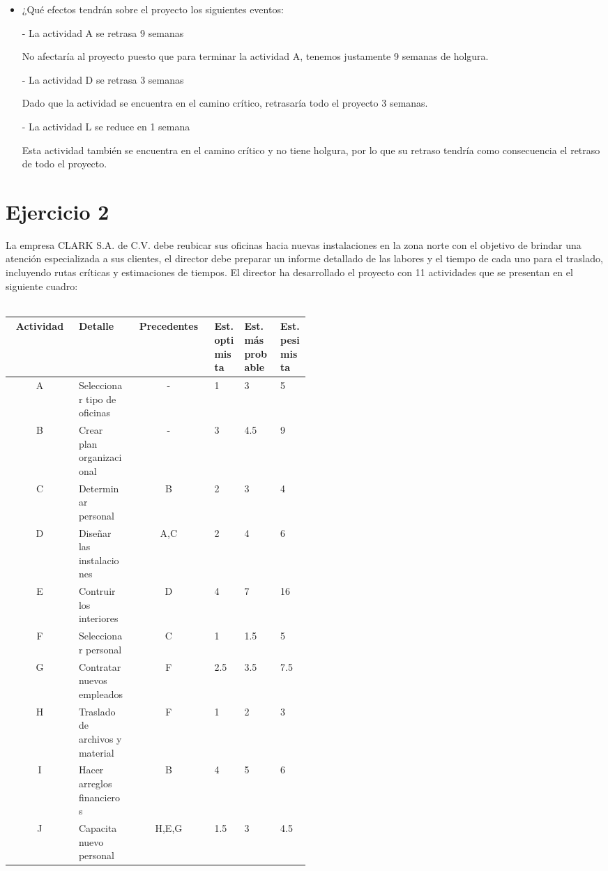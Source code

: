 \documentclass[12pt]{article}
\begin{document}
\begin{itemize}
    \item ¿Qué efectos tendrán sobre el proyecto los siguientes eventos:

    - La actividad A se retrasa 9 semanas

No afectaría al proyecto puesto que para terminar la actividad A, tenemos
justamente 9 semanas de holgura.

    - La actividad D se retrasa 3 semanas

Dado que la actividad se encuentra en el camino crítico, retrasaría todo el
proyecto 3 semanas.

    - La actividad L se reduce en 1 semana

Esta actividad también se encuentra en el camino crítico y no tiene holgura, por
lo que su retraso tendría como consecuencia el retraso de todo el proyecto.

\end{itemize}

\pagebreak
\section{Ejercicio 2}

La empresa CLARK S.A. de C.V. debe reubicar sus oficinas hacia nuevas
instalaciones en la zona norte con el objetivo de brindar una atención
especializada a sus clientes, el director debe preparar un informe detallado de
las labores y el tiempo de cada uno para el traslado, incluyendo rutas críticas
y estimaciones de tiempos. El director ha desarrollado el proyecto con 11
actividades que se presentan en el siguiente cuadro: \\
\\
\begin{center}
  \begin{tabular}{cp{0.18\linewidth}cp{0.1\linewidth}p{0.12\linewidth}p{0.1\linewidth}}
    Actividad   &    Detalle    &   Precedentes & Est. optimista  & Est.
    más probable    &   Est. pesimista    \\
    \hline
      A  & Seleccionar tipo de oficinas & -      &  1    &  3   &  5  \\
      B  & Crear plan organizacional    & -      &  3    &  4.5 &  9  \\ 
      C  & Determinar personal          & B      &  2    &  3   &  4  \\ 
      D  & Diseñar las instalaciones    & A,C    &  2    &  4   &  6  \\ 
      E  & Contruir los interiores      & D      &  4    &  7   &  16 \\
      F  & Seleccionar personal         & C      &  1    &  1.5 &  5  \\
      G  & Contratar nuevos empleados   & F      &  2.5  &  3.5 &  7.5\\
      H  & Traslado de archivos y material & F      &  1    &  2   &  3  \\
      I  & Hacer arreglos financieros   & B      &  4    &  5   &  6  \\
      J  & Capacita nuevo personal      & H,E,G  &  1.5  &  3   &  4.5
  \end{tabular}
\end{center}
\end{document}
